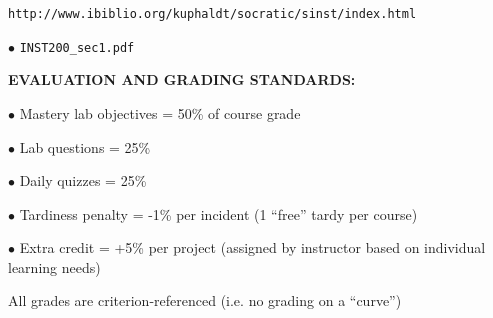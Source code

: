 \noindent
{\tt http://www.ibiblio.org/kuphaldt/socratic/sinst/index.html} 

\vskip 5pt

\item{$\bullet$} {\tt INST200\_sec1.pdf} 


\vfil \eject

\noindent
{\bf EVALUATION AND GRADING STANDARDS:} 

\item{$\bullet$} Mastery lab objectives = 50\% of course grade
\item{$\bullet$} Lab questions = 25\% 
\item{$\bullet$} Daily quizzes = 25\%
\item{$\bullet$} Tardiness penalty = -1\% per incident (1 ``free'' tardy per course)
\item{$\bullet$} Extra credit = +5\% per project (assigned by instructor based on individual learning needs)

\vskip 10pt

\noindent
All grades are criterion-referenced (i.e. no grading on a ``curve'')

